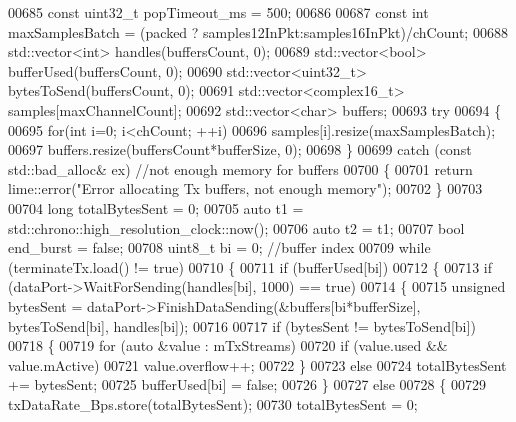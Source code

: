 \begin{DoxyCode}
00685     \textcolor{keyword}{const} uint32\_t popTimeout\_ms = 500;
00686 
00687     \textcolor{keyword}{const} \textcolor{keywordtype}{int} maxSamplesBatch = (packed ? samples12InPkt:samples16InPkt)/chCount;
00688     std::vector<int> handles(buffersCount, 0);
00689     std::vector<bool> bufferUsed(buffersCount, 0);
00690     std::vector<uint32\_t> bytesToSend(buffersCount, 0);
00691     std::vector<complex16\_t> samples[maxChannelCount];
00692     std::vector<char> buffers;
00693     \textcolor{keywordflow}{try}
00694     \{
00695         \textcolor{keywordflow}{for}(\textcolor{keywordtype}{int} i=0; i<chCount; ++i)
00696             samples[i].resize(maxSamplesBatch);
00697         buffers.resize(buffersCount*bufferSize, 0);
00698     \}
00699     \textcolor{keywordflow}{catch} (\textcolor{keyword}{const} std::bad\_alloc& ex) \textcolor{comment}{//not enough memory for buffers}
00700     \{
00701         \textcolor{keywordflow}{return} lime::error(\textcolor{stringliteral}{"Error allocating Tx buffers, not enough memory"});
00702     \}
00703 
00704     \textcolor{keywordtype}{long} totalBytesSent = 0;
00705     \textcolor{keyword}{auto} t1 = std::chrono::high\_resolution\_clock::now();
00706     \textcolor{keyword}{auto} t2 = t1;
00707     \textcolor{keywordtype}{bool} end\_burst = \textcolor{keyword}{false};
00708     uint8\_t bi = 0; \textcolor{comment}{//buffer index}
00709     \textcolor{keywordflow}{while} (terminateTx.load() != \textcolor{keyword}{true})
00710     \{
00711         \textcolor{keywordflow}{if} (bufferUsed[bi])
00712         \{
00713             \textcolor{keywordflow}{if} (dataPort->WaitForSending(handles[bi], 1000) == \textcolor{keyword}{true})
00714             \{
00715                 \textcolor{keywordtype}{unsigned} bytesSent = dataPort->FinishDataSending(&buffers[bi*bufferSize], bytesToSend[bi], 
      handles[bi]);
00716 
00717                 \textcolor{keywordflow}{if} (bytesSent != bytesToSend[bi])
00718                 \{
00719                     \textcolor{keywordflow}{for} (\textcolor{keyword}{auto} &value : mTxStreams)
00720                         \textcolor{keywordflow}{if} (value.used && value.mActive)
00721                             value.overflow++;
00722                 \}
00723                 \textcolor{keywordflow}{else}
00724                     totalBytesSent += bytesSent;
00725                 bufferUsed[bi] = \textcolor{keyword}{false};
00726             \}
00727             \textcolor{keywordflow}{else}
00728             \{
00729                 txDataRate_Bps.store(totalBytesSent);
00730                 totalBytesSent = 0;

\end{DoxyCode}
